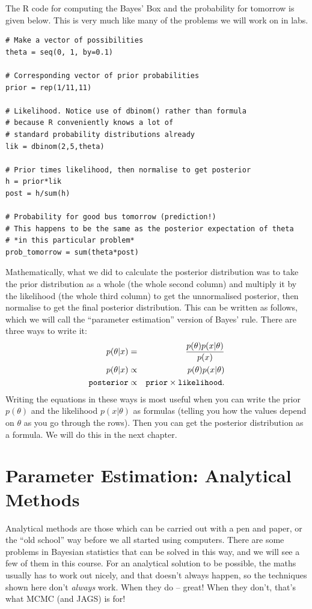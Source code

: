The R code for computing the Bayes' Box and the probability for tomorrow
is given below. This is
very much like many of the problems we will work on in labs.

\begin{framed}
\begin{verbatim}
# Make a vector of possibilities
theta = seq(0, 1, by=0.1)

# Corresponding vector of prior probabilities
prior = rep(1/11,11)

# Likelihood. Notice use of dbinom() rather than formula
# because R conveniently knows a lot of
# standard probability distributions already
lik = dbinom(2,5,theta)

# Prior times likelihood, then normalise to get posterior
h = prior*lik
post = h/sum(h)

# Probability for good bus tomorrow (prediction!)
# This happens to be the same as the posterior expectation of theta
# *in this particular problem*
prob_tomorrow = sum(theta*post)
\end{verbatim}
\end{framed}

Mathematically, what we did to calculate the posterior distribution was to
take the prior distribution as a whole (the whole second column) and multiply it
by the likelihood (the whole third column) to get the
unnormalised posterior, then normalise to get the final posterior distribution.
This can be written as follows, which we will call the ``parameter estimation''
version of Bayes' rule. There are three ways to write it:
\begin{eqnarray}
p(\theta | x) &=& \frac{p(\theta)p(x|\theta)}{p(x)}\\
p(\theta | x) &\propto& p(\theta)p(x|\theta)\\
{\tt posterior} &\propto& {\tt prior}\times{\tt likelihood}.
\end{eqnarray}
Writing the equations in these ways is most useful when you can write the
prior $p(\theta)$ and the likelihood $p(x|\theta)$ as formulas (telling you
how the values depend on $\theta$ as you go through the rows). Then you can get the
posterior distribution as a formula. We will do this in the next chapter.

\chapter{Parameter Estimation: Analytical Methods}
Analytical methods are those which can be carried out with a pen and paper,
or the ``old school'' way before we all started using computers. There are some
problems in Bayesian statistics that can be solved in this way, and we will
see a few of them in this course. For an analytical solution to be possible, the
maths usually has to work out nicely, and that doesn't always happen, so
the techniques shown here don't {\it always} work. When they do -- great! When
they don't, that's what MCMC (and JAGS) is for!

